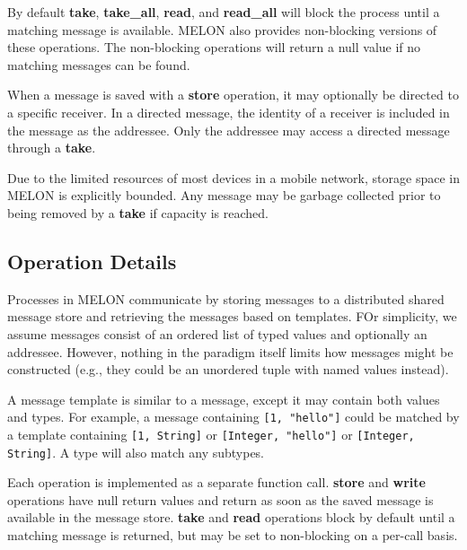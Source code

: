By default \textbf{take}, \textbf{take\_all}, \textbf{read}, and \textbf{read\_all} will block the process until a matching message is available. MELON also provides non-blocking versions of these operations. The non-blocking operations will return a null value if no matching messages can be found.

When a message is saved with a \textbf{store} operation, it may optionally be directed to a specific receiver. In a directed message, the identity of a receiver is included in the message as the addressee. Only the addressee may access a directed message through a \textbf{take}.

Due to the limited resources of most devices in a mobile network, storage space in MELON is explicitly bounded. Any message may be garbage collected prior to being removed by a \textbf{take} if capacity is reached.

\subsection{Operation Details}

Processes in MELON communicate by storing messages to a distributed shared message store and retrieving the messages based on templates. FOr simplicity, we assume messages consist of an ordered list of typed values and optionally an addressee. However, nothing in the paradigm itself limits how messages might be constructed (e.g., they could be an unordered tuple with named values instead).

A message template is similar to a message, except it may contain both values and types. For example, a message containing \texttt{[1, "hello"]} could be matched by a template containing \texttt{[1, String]} or \texttt{[Integer, "hello"]} or \texttt{[Integer, String]}. A type will also match any subtypes.

Each operation is implemented as a separate function call. \textbf{store} and \textbf{write} operations have null return values and return as soon as the saved message is available in the message store. \textbf{take} and \textbf{read} operations block by default until a matching message is returned, but may be set to non-blocking on a per-call basis.

